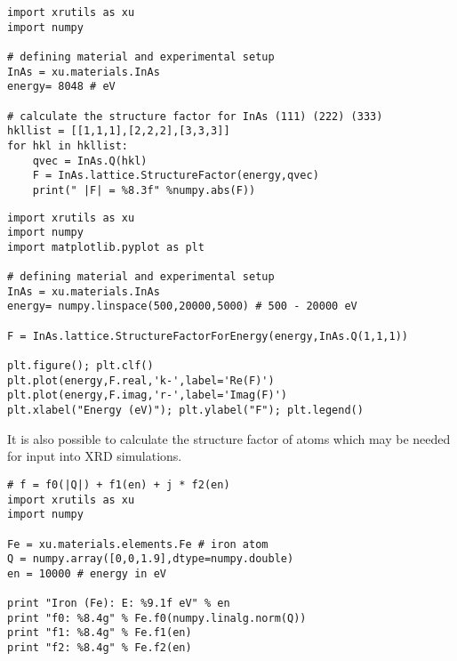 \begin{lstlisting}[caption=calculation of the reflection strength of a Bragg reflection]
import xrutils as xu
import numpy

# defining material and experimental setup
InAs = xu.materials.InAs
energy= 8048 # eV

# calculate the structure factor for InAs (111) (222) (333)
hkllist = [[1,1,1],[2,2,2],[3,3,3]]
for hkl in hkllist:
    qvec = InAs.Q(hkl)
    F = InAs.lattice.StructureFactor(energy,qvec)
    print(" |F| = %8.3f" %numpy.abs(F))
\end{lstlisting}

\begin{lstlisting}[caption=energy dependency of the structure factor]
import xrutils as xu
import numpy
import matplotlib.pyplot as plt

# defining material and experimental setup
InAs = xu.materials.InAs
energy= numpy.linspace(500,20000,5000) # 500 - 20000 eV

F = InAs.lattice.StructureFactorForEnergy(energy,InAs.Q(1,1,1))

plt.figure(); plt.clf()
plt.plot(energy,F.real,'k-',label='Re(F)')
plt.plot(energy,F.imag,'r-',label='Imag(F)')
plt.xlabel("Energy (eV)"); plt.ylabel("F"); plt.legend()
\end{lstlisting}

It is also possible to calculate the structure factor of atoms which may be needed for input into XRD simulations.

\begin{lstlisting}[caption=components of the structure factor for simulations]
# f = f0(|Q|) + f1(en) + j * f2(en)
import xrutils as xu
import numpy

Fe = xu.materials.elements.Fe # iron atom
Q = numpy.array([0,0,1.9],dtype=numpy.double)
en = 10000 # energy in eV

print "Iron (Fe): E: %9.1f eV" % en
print "f0: %8.4g" % Fe.f0(numpy.linalg.norm(Q))
print "f1: %8.4g" % Fe.f1(en)
print "f2: %8.4g" % Fe.f2(en)
\end{lstlisting}


